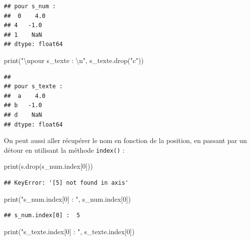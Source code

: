 \documentclass[
  12pt,
]{book}
\newenvironment{Shaded}{\begin{snugshade}}{\end{snugshade}}
\newcommand{\BuiltInTok}[1]{#1}
\newcommand{\CharTok}[1]{\textcolor[rgb]{0.31,0.60,0.02}{#1}}
\newcommand{\DecValTok}[1]{\textcolor[rgb]{0.00,0.00,0.81}{#1}}
\newcommand{\NormalTok}[1]{#1}
\newcommand{\StringTok}[1]{\textcolor[rgb]{0.31,0.60,0.02}{#1}}
\numberwithin{equation}{section}
\numberwithin{countremarque}{section}
\begin{document}
\begin{lstlisting}
## pour s_num : 
##  0    4.0
## 4   -1.0
## 1    NaN
## dtype: float64
\end{lstlisting}

\begin{Shaded}
\begin{Highlighting}[]
\BuiltInTok{print}\NormalTok{(}\StringTok{"}\CharTok{\textbackslash{}n}\StringTok{pour s\_texte : }\CharTok{\textbackslash{}n}\StringTok{"}\NormalTok{, s\_texte.drop(}\StringTok{"c"}\NormalTok{))}
\end{Highlighting}
\end{Shaded}

\begin{lstlisting}
## 
## pour s_texte : 
##  a    4.0
## b   -1.0
## d    NaN
## dtype: float64
\end{lstlisting}

On peut aussi aller récupérer le nom en fonction de la position, en passant par un détour en utilisant la méthode \texttt{index()} :

\begin{Shaded}
\begin{Highlighting}[]
\BuiltInTok{print}\NormalTok{(s.drop(s\_num.index[}\DecValTok{0}\NormalTok{]))}
\end{Highlighting}
\end{Shaded}

\begin{lstlisting}
## KeyError: '[5] not found in axis'
\end{lstlisting}

\begin{Shaded}
\begin{Highlighting}[]
\BuiltInTok{print}\NormalTok{(}\StringTok{"s\_num.index[0] : "}\NormalTok{, s\_num.index[}\DecValTok{0}\NormalTok{])}
\end{Highlighting}
\end{Shaded}

\begin{lstlisting}
## s_num.index[0] :  5
\end{lstlisting}

\begin{Shaded}
\begin{Highlighting}[]
\BuiltInTok{print}\NormalTok{(}\StringTok{"s\_texte.index[0] : "}\NormalTok{, s\_texte.index[}\DecValTok{0}\NormalTok{])}
\end{Highlighting}
\end{Shaded}
\end{document}

